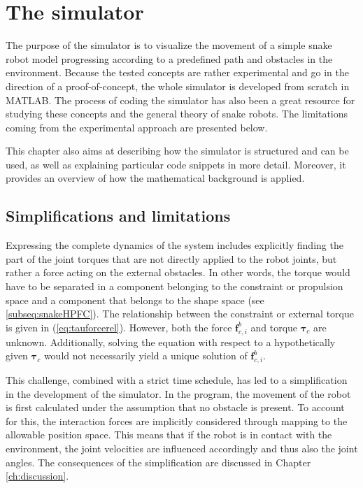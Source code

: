 \chapter{The simulator}\label{ch:simulator}

The purpose of the simulator is to visualize the movement of a simple snake robot model progressing according to a predefined path and obstacles in the environment. Because the tested concepts are rather experimental and go in the direction of a proof-of-concept, the whole simulator is developed from scratch in MATLAB. The process of coding the simulator has also been a great resource for studying these concepts and the general theory of snake robots. The limitations coming from the experimental approach are presented below.

This chapter also aims at describing how the simulator is structured and can be used, as well as explaining particular code snippets in more detail. Moreover, it provides an overview of how the mathematical background is applied.


\section{Simplifications and limitations}

Expressing the complete dynamics of the system includes explicitly finding the part of the joint torques that are not directly applied to the robot joints, but rather a force acting on the external obstacles. In other words, the torque would have to be separated in a component belonging to the constraint or propulsion space and a component that belongs to the shape space (see \ref{subseq:snakeHPFC}). The relationship between the constraint or external torque is given in (\ref{eq:tauforcerel}). However, both the force $\mathbf{f}^b_{c,i}$ and torque $\boldsymbol{\tau}_c$ are unknown. Additionally, solving the equation with respect to a hypothetically given $\boldsymbol{\tau}_c$ would not necessarily yield a unique solution of $\mathbf{f}^b_{c,i}$.

This challenge, combined with a strict time schedule, has led to a simplification in the development of the simulator. In the program, the movement of the robot is first calculated under the assumption that no obstacle is present. To account for this, the interaction forces are implicitly considered through mapping to the allowable position space. This means that if the robot is in contact with the environment, the joint velocities are influenced accordingly and thus also the joint angles. The consequences of the simplification are discussed in Chapter \ref{ch:discussion}.

